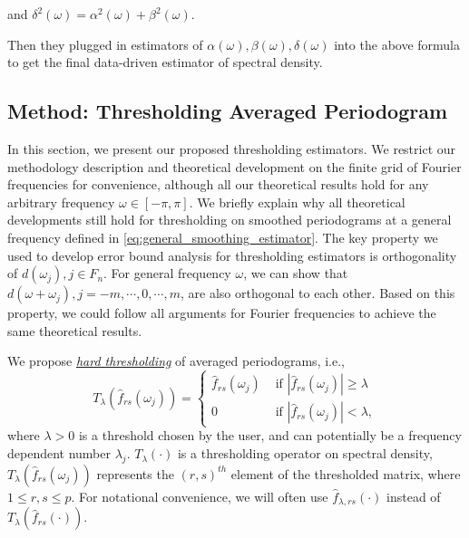 and $\delta^2(\omega) = \alpha^2(\omega)+\beta^2(\omega)$. 
\iffalse
\begin{equation}
\begin{aligned}
&\alpha^2(\omega) = \frac 1 p \|f^0(\omega) - \mu(\omega)I_p\|^2_F,\\
&\beta^2(\omega) = \frac 1 p \|f^0(\omega)-\hat{f}(\omega)\|^2_F,\\
& \delta^2(\omega) = \alpha^2(\omega)+\beta^2(\omega).
\end{aligned}
\end{equation}
\fi
Then they plugged in estimators of $\alpha(\omega), \beta(\omega), \delta(\omega)$ into the above formula to get the final data-driven estimator of spectral density. \par

\subsection{Method: Thresholding Averaged Periodogram} \label{sec:method_threshold}
In this section, we present our proposed thresholding estimators. We restrict our methodology description and theoretical development on the finite grid of Fourier frequencies for convenience, although all our theoretical results hold for any arbitrary frequency $\omega \in [-\pi, \pi]$. We briefly explain why all theoretical developments still hold for thresholding on smoothed periodograms at a  general frequency defined in \eqref{eq:general_smoothing_estimator}. The key property we used to develop error bound analysis for thresholding estimators is orthogonality of $d(\omega_j), j\in F_n$. For general frequency $\omega$, we can show that $d(\omega+\omega_j), j=-m,\cdots, 0, \cdots, m$, are also orthogonal to each other. Based on this property, we could follow all arguments for Fourier  frequencies to achieve the same theoretical results. 


We propose \textit{\underline{hard thresholding}} of averaged periodograms, i.e., 
\begin{equation}
T_{\lambda}(\hat{f}_{rs}(\omega_j))= \begin{cases}
\hat{f}_{rs}(\omega_j) & \mbox{ if } |\hat{f}_{rs}(\omega_j)|\ge \lambda \\
0 & \mbox{ if } |\hat{f}_{rs}(\omega_j)| < \lambda,
\end{cases}
\end{equation}
where $\lambda > 0$ is a threshold chosen by the user, and can potentially be a frequency dependent number $\lambda_j$. $T_\lambda(\cdot)$ is a thresholding operator on spectral density, $T_{\lambda}(\hat{f}_{rs}(\omega_j))$ represents the $(r,s)^{th}$ element of the thresholded matrix, where $1 \le r, s \le p$. For notational convenience, we will often use $\hat{f}_{\lambda, rs}(\cdot)$ instead of $T_{\lambda}(\hat{f}_{rs}(\cdot))$.

